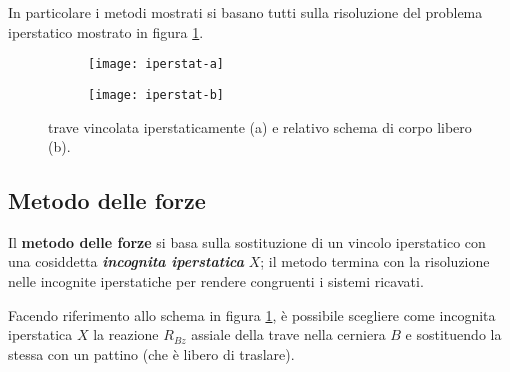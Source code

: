 	In particolare i metodi mostrati si basano tutti sulla risoluzione del problema iperstatico mostrato in figura \ref{fig:sv:traveiperstatica-a}.
	
	\begin{figure}[bht]
		\centering
		\begin{subfigure}{0.48\linewidth}
			\centering
			\texttt{[image: iperstat-a]} \caption{}
		\end{subfigure}
		\begin{subfigure}{0.48\linewidth}
			\centering
			\texttt{[image: iperstat-b]} \caption{}
		\end{subfigure}
		\caption{trave vincolata iperstaticamente (a) e relativo schema di corpo libero (b).} \label{fig:sv:traveiperstatica-a}
	\end{figure}
	
	\subsection{Metodo delle forze}
		\begin{concetto}
			Il \textbf{metodo delle forze} si basa sulla sostituzione di un vincolo iperstatico con una cosiddetta \textbf{\textit{incognita iperstatica}} $X$; il metodo termina con la risoluzione nelle incognite iperstatiche per rendere congruenti i sistemi ricavati.
		\end{concetto}
		
		Facendo riferimento allo schema in figura \ref{fig:sv:traveiperstatica-a}, è possibile scegliere come incognita iperstatica $X$ la reazione $R_{Bz}$ assiale della trave nella cerniera $B$ e sostituendo la stessa con un pattino (che è libero di traslare).
		
		
